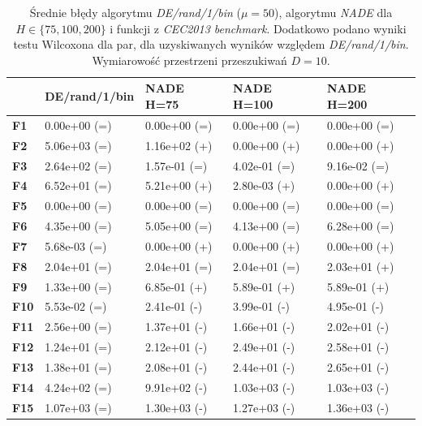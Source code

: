 \documentclass[12pt,a4paper]{report}
\begin{document}
{{{{{{{\begin{table}[h]
\centering
\caption{Średnie błędy algorytmu \emph{DE/rand/1/bin} ($\mu = 50$), algorytmu \emph{NADE} dla $H \in \{75, 100, 200\}$ i funkcji z \emph{CEC2013 benchmark}. Dodatkowo podano wyniki testu Wilcoxona dla par, dla uzyskiwanych wyników względem \emph{DE/rand/1/bin}. Wymiarowość przestrzeni przeszukiwań $D = 10$.}
\label{FullEksp110}
\begin{tabular}{|l|l|l|l|l|}
\hline
          & {\bf DE/rand/1/bin} & {\bf NADE H=75} & {\bf NADE H=100} & {\bf NADE H=200} \\ \hline
{\bf F1}  & 0.00e+00 (=)        & 0.00e+00 (=)    & 0.00e+00 (=)     & 0.00e+00 (=)     \\ \hline
{\bf F2}  & 5.06e+03 (=)        & 1.16e+02 (+)    & 0.00e+00 (+)     & 0.00e+00 (+)     \\ \hline
{\bf F3}  & 2.64e+02 (=)        & 1.57e-01 (=)    & 4.02e-01 (=)     & 9.16e-02 (=)     \\ \hline
{\bf F4}  & 6.52e+01 (=)        & 5.21e+00 (+)    & 2.80e-03 (+)     & 0.00e+00 (+)     \\ \hline
{\bf F5}  & 0.00e+00 (=)        & 0.00e+00 (=)    & 0.00e+00 (=)     & 0.00e+00 (=)     \\ \hline
{\bf F6}  & 4.35e+00 (=)        & 5.05e+00 (=)    & 4.13e+00 (=)     & 6.28e+00 (=)     \\ \hline
{\bf F7}  & 5.68e-03 (=)        & 0.00e+00 (+)    & 0.00e+00 (+)     & 0.00e+00 (+)     \\ \hline
{\bf F8}  & 2.04e+01 (=)        & 2.04e+01 (=)    & 2.04e+01 (=)     & 2.03e+01 (+)     \\ \hline
{\bf F9}  & 1.33e+00 (=)        & 6.85e-01 (+)    & 5.89e-01 (+)     & 5.89e-01 (+)     \\ \hline
{\bf F10} & 5.53e-02 (=)        & 2.41e-01 (-)    & 3.99e-01 (-)     & 4.95e-01 (-)     \\ \hline
{\bf F11} & 2.56e+00 (=)        & 1.37e+01 (-)    & 1.66e+01 (-)     & 2.02e+01 (-)     \\ \hline
{\bf F12} & 1.24e+01 (=)        & 2.12e+01 (-)    & 2.49e+01 (-)     & 2.58e+01 (-)     \\ \hline
{\bf F13} & 1.38e+01 (=)        & 2.08e+01 (-)    & 2.44e+01 (-)     & 2.65e+01 (-)     \\ \hline
{\bf F14} & 4.24e+02 (=)        & 9.91e+02 (-)    & 1.03e+03 (-)     & 1.03e+03 (-)     \\ \hline
{\bf F15} & 1.07e+03 (=)        & 1.30e+03 (-)    & 1.27e+03 (-)     & 1.36e+03 (-)     \\ \hline

\end{tabular}
\end{table}}}}}}}}
\end{document}
